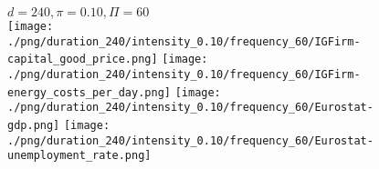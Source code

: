 \begin{figure}[ht!]
\centering\leavevmode
\begin{minipage}{13cm}
\centering\leavevmode
{$d=240, \pi=0.10, \Pi=60$}\\
\texttt{[image: ./png/duration\_240/intensity\_0.10/frequency\_60/IGFirm-capital\_good\_price.png]}
\texttt{[image: ./png/duration\_240/intensity\_0.10/frequency\_60/IGFirm-energy\_costs\_per\_day.png]}
\texttt{[image: ./png/duration\_240/intensity\_0.10/frequency\_60/Eurostat-gdp.png]}
\texttt{[image: ./png/duration\_240/intensity\_0.10/frequency\_60/Eurostat-unemployment\_rate.png]}
\end{minipage}
\end{figure}

